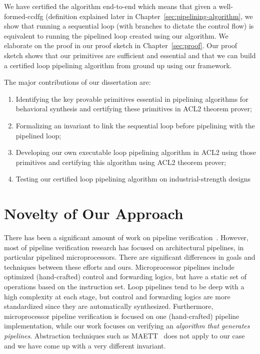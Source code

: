 We have certified the algorithm end-to-end which means that given a well-formed-ccdfg (definition explained later in Chapter~\ref{sec:pipelining-algorithm}, we show that running a sequential loop (with branches to dictate the control flow) is equivalent to running the pipelined loop created using our algorithm. We elaborate on the proof in our proof sketch in Chapter~\ref{sec:proof}. Our proof sketch shows that our primitives are sufficient and essential and that we can build a certified loop pipelining algorithm from ground up using our framework.

The major contributions of our dissertation are:
\begin{enumerate}[--]
\item Identifying the key provable primitives essential in pipelining algorithms for behavioral synthesis and certifying these primitives in ACL2 theorem prover;
\item Formalizing an invariant to link the sequential loop before pipelining with the pipelined loop;
\item Developing our own executable loop pipelining algorithm in ACL2 using those primitives and certifying this algorithm using ACL2 theorem prover;
\item Testing our certified loop pipelining algorithm on industrial-strength designs
\end{enumerate}

\section {Novelty of Our Approach}
There has been a significant amount of work on pipeline
verification~\cite{bd:pipeline,sh:pipeline,pm:pipelines,velev05}.
However, most of pipeline verification research has focused
on architectural pipelines, in particular pipelined
microprocessors. There are significant differences in goals
and techniques between these efforts and ours.
Microprocessor pipelines include optimized (hand-crafted)
control and forwarding logics, but have a static set of
operations based on the instruction set.  Loop pipelines
tend to be deep with a high complexity at each stage, but
control and forwarding logics are more standardized since
they are automatically synthesized.  
Furthermore, microprocessor pipeline verification
is focused on one (hand-crafted) pipeline implementation,
while our work focuses on verifying an {\em algorithm
that generates pipelines}.  Abstraction techniques
such as MAETT~\cite{sh:pipeline} does not apply to our case
and we have come up with a very different invariant.

